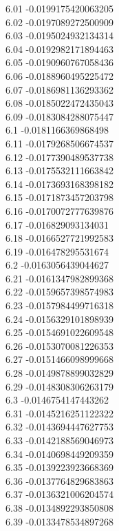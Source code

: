 {6.01	-0.0199175420063205\\
6.02	-0.0197089272500909\\
6.03	-0.0195024932134314\\
6.04	-0.0192982171894463\\
6.05	-0.0190960767058436\\
6.06	-0.0188960495225472\\
6.07	-0.0186981136293362\\
6.08	-0.0185022472435043\\
6.09	-0.0183084288075447\\
6.1	-0.0181166369868498\\
6.11	-0.0179268506674537\\
6.12	-0.0177390489537738\\
6.13	-0.0175532111663842\\
6.14	-0.0173693168398182\\
6.15	-0.0171873457203798\\
6.16	-0.0170072777639876\\
6.17	-0.016829093134031\\
6.18	-0.0166527721992583\\
6.19	-0.016478295531674\\
6.2	-0.0163056439044627\\
6.21	-0.0161347982899368\\
6.22	-0.0159657398574983\\
6.23	-0.0157984499716318\\
6.24	-0.0156329101898939\\
6.25	-0.0154691022609548\\
6.26	-0.0153070081226353\\
6.27	-0.0151466098999668\\
6.28	-0.0149878899032829\\
6.29	-0.0148308306263179\\
6.3	-0.0146754147443262\\
6.31	-0.0145216251122322\\
6.32	-0.0143694447627753\\
6.33	-0.0142188569046973\\
6.34	-0.0140698449209359\\
6.35	-0.0139223923668369\\
6.36	-0.0137764829683863\\
6.37	-0.0136321006204574\\
6.38	-0.0134892293850808\\
6.39	-0.0133478534897268\\
}
